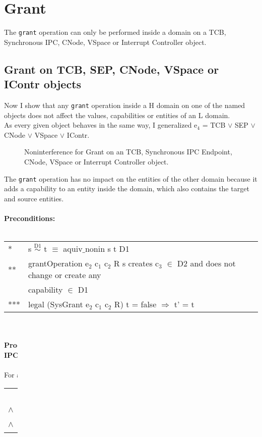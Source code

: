 \section{Grant}\label{sec:Grant}
The \texttt{grant} operation can only be performed inside a domain on a TCB, Synchronous IPC, CNode, VSpace or Interrupt Controller object. 
\subsection{Grant on TCB, SEP, CNode, VSpace or IContr objects} 
Now I show that any \texttt{grant} operation inside a H domain on one of the named objects does not affect the values, capabilities or entities of an L domain. \\
As every given object behaves in the same way, I generalized e$_4$ = TCB $\vee$ SEP $\vee$ CNode $\vee$ VSpace $\vee$ IContr.
\begin{figure}[H]
\caption{Noninterference for Grant on an TCB, Synchronous IPC Endpoint, CNode, VSpace or Interrupt Controller object.}
\end{figure}
The \texttt{grant} operation has no impact on the entities of the other domain because it adds a capability to an entity inside the domain, which also contains the target and source entities. \\ \\
\textbf{Preconditions:} \\ \\
\begin{tabular}{ll}
* & s $\overset{\text{D1}}{\sim}$ t $\equiv$ aquiv$\_$nonin s t D1	\\ 
** & grantOperation e$_2$ c$_1$ c$_2$ R s creates c$_3$ $\in$ D2 and does not change or create any \\
& capability $\in$ D1 \\ 
*** & legal (SysGrant e$_2$ c$_1$ c$_2$ R) t = false $\Rightarrow$ t' = t
\end{tabular}\\ \\ 
\textbf{Proof of the noninterference property for \texttt{grant} on TCB, Synchronous IPC Endpoint, CNode, VSpace and Interrupt Controller objects:}\\ \\
For all e $\in$ D1, we have: \\ 
\begin{tabular}{ll}
& (value$\_$of s' e $\overset{\text{**}}{=}$ value$\_$of s e $\overset{\text{*}}{=}$ value$\_$of t e $\overset{\text{***}}{=}$ value$\_$of t' e \\
$\wedge$ & caps$\_$of s' e $\overset{\text{**}}{=}$ caps$\_$of s e $\overset{\text{*}}{=}$ caps$\_$of t e $\overset{\text{***}}{=}$ caps$\_$of t' e \\
$\wedge$ & subSys s' e $\overset{\text{**}}{=}$ subSys s e $\overset{\text{*}}{=}$ subSys t e $\overset{\text{***}}{=}$ subSys t' e)
\end{tabular} \\
